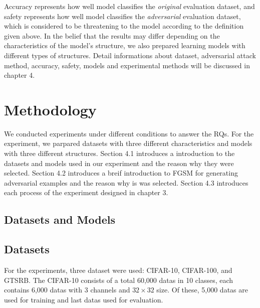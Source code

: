 \documentclass[journal,article,submit,moreauthors,pdftex]{Definitions/mdpi}
\begin{document}
Accuracy represents how well model classifies the {\it original} evaluation dataset, and safety represents how well model classifies the {\it adversarial} evaluation dataset, which is considered to be threatening to the model according to the definition given above.
In the belief that the results may differ depending on the characteristics of the model's structure, we also prepared learning models with different types of structures. 
Detail informations about dataset, adversarial attack method, accuracy, safety, models and experimental methods will be discussed in chapter 4.

\section{Methodology}

We conducted experiments under different conditions to answer the RQs. For the experiment, we parpared datasets with three different characteristics and models with three different structures.
Section 4.1 introduces a introduction to the datasets and models used in our experiment and the reason why they were selected.
Section 4.2 introduces a breif introduction to FGSM for generating adversarial examples and the reason why is was selected.
Section 4.3 introduces each process of the experiment designed in chapter 3.

\subsection{Datasets and Models}

\subsection{Datasets}

For the experiments, three dataset were used: CIFAR-10, CIFAR-100, and GTSRB.
The CIFAR-10 consists of a total 60,000 datas in 10 classes, each contains 6,000 datas with 3 channels and \begin{math}{32\times 32}\end{math} size.
Of these, 5,000 datas are used for training and last datas used for evaluation.
\end{document}

